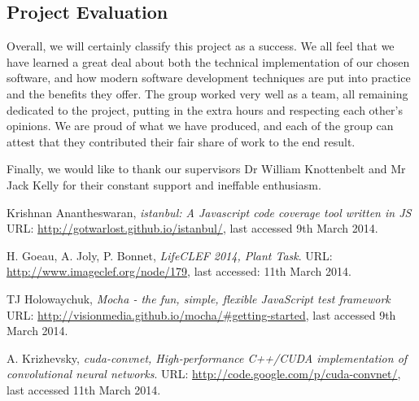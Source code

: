 \documentclass[a4paper,11pt]{article}
\begin{document}
\begin{description}
\subsection{Project Evaluation}

Overall, we will certainly classify this project as a success. We all feel that we have learned a great deal about both the technical implementation of our chosen software, and how modern software development techniques are put into practice and the benefits they offer. The group worked very well as a team, all remaining dedicated to the project, putting in the extra hours and respecting each other's opinions. We are proud of what we have produced, and each of the group can attest that they contributed their fair share of work to the end result. 

\hspace{5 mm} Finally, we would like to thank our supervisors Dr William Knottenbelt and Mr Jack Kelly for their constant support and ineffable enthusiasm.





\clearpage

\begin{thebibliography}{1}


 Krishnan Anantheswaran,
  \emph{istanbul: A Javascript code coverage tool written in JS}\\
 URL: \url{http://gotwarlost.github.io/istanbul/}, last accessed 9th March 2014.

  H. Goeau, A. Joly, P. Bonnet,
  \emph{LifeCLEF 2014,  Plant Task}.
 URL: \url{http://www.imageclef.org/node/179}, last accessed: 11th March 2014.

 TJ Holowaychuk,
  \emph{Mocha - the fun, simple, flexible JavaScript test framework}\\
 URL: \url{http://visionmedia.github.io/mocha/#getting-started}, last accessed 9th March 2014. 

 A. Krizhevsky,
  \emph{cuda-convnet, High-performance C++/CUDA implementation of convolutional neural networks}.
 URL: \url{http://code.google.com/p/cuda-convnet/}, last accessed 11th March 2014.


\end{thebibliography}
\end{description}
\end{document}
